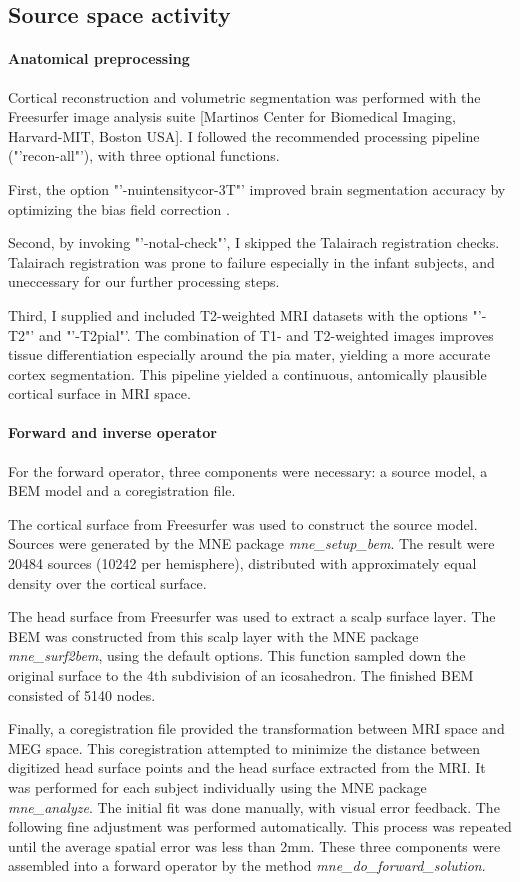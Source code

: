 \subsection{Source space activity}

\paragraph{Anatomical preprocessing}
Cortical reconstruction and volumetric segmentation was performed with the Freesurfer image analysis suite [Martinos Center for Biomedical Imaging, Harvard-MIT, Boston USA].
I followed the recommended processing pipeline ("'recon-all"'), with three optional functions.

First, the option "'-nuintensitycor-3T"' improved brain segmentation accuracy by optimizing the bias field correction \cite{3.3.nuintensity}.

Second, by invoking "'-notal-check"', I skipped the Talairach registration checks.
Talairach registration was prone to failure especially in the infant subjects, and uneccessary for our further processing steps.

Third, I supplied and included T2-weighted MRI datasets with the options "'-T2"' and "'-T2pial"'.
The combination of T1- and T2-weighted images improves tissue differentiation especially around the pia mater, yielding a more accurate cortex segmentation.
This pipeline yielded a continuous, antomically plausible cortical surface in MRI space.


\paragraph{Forward and inverse operator}
For the forward operator, three components were necessary: a source model, a BEM model and a coregistration file.

The cortical surface from Freesurfer was used to construct the source model.
Sources were generated by the MNE package \emph{mne\_setup\_bem}.
The result were 20484 sources (10242 per hemisphere), distributed with approximately equal density over the cortical surface.

The head surface from Freesurfer was used to extract a scalp surface layer.
The BEM was constructed from this scalp layer with the MNE package \emph{mne\_surf2bem}, using the default options.
This function sampled down the original surface to the 4th subdivision of an icosahedron.
The finished BEM consisted of 5140 nodes.

Finally, a coregistration file provided the transformation between MRI space and MEG space.
This coregistration attempted to minimize the distance between digitized head surface points and the head surface extracted from the MRI. 
It was performed for each subject individually using the MNE package \emph{mne\_analyze}.
The initial fit was done manually, with visual error feedback.
The following fine adjustment was performed automatically.
This process was repeated until the average spatial error was less than 2mm.
These three components were assembled into a forward operator by the method \emph{mne\_do\_forward\_solution}.


